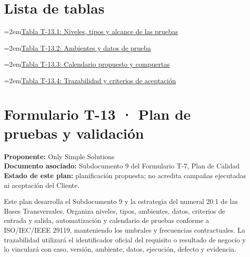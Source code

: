 \documentclass[11pt]{article}
\begin{document}
\renewcommand{\tablename}{Tabla}
\renewcommand{\thetable}{T-13.\arabic{table}}

\tableofcontents
\clearpage
\section*{Lista de tablas}

\noindent\hangindent=2em\hyperref[tab:t13-1]{Tabla T-13.1: Niveles, tipos y alcance de las pruebas}\dotfill\pageref{tab:t13-1}\par\vspace{0.4\baselineskip}
\noindent\hangindent=2em\hyperref[tab:t13-2]{Tabla T-13.2: Ambientes y datos de prueba}\dotfill\pageref{tab:t13-2}\par\vspace{0.4\baselineskip}
\noindent\hangindent=2em\hyperref[tab:t13-3]{Tabla T-13.3: Calendario propuesto y compuertas}\dotfill\pageref{tab:t13-3}\par\vspace{0.4\baselineskip}
\noindent\hangindent=2em\hyperref[tab:t13-4]{Tabla T-13.4: Trazabilidad y criterios de aceptación}\dotfill\pageref{tab:t13-4}\par\vspace{0.4\baselineskip}
\clearpage


\section{Formulario T-13 · Plan de pruebas y validación}\label{t13-formulario-t-13-plan-de-pruebas-y-validaciuxf3n}

\textbf{Proponente:} Only Simple Solutions\\
\textbf{Documento asociado:} Subdocumento 9 del Formulario T-7, Plan de Calidad\\
\textbf{Estado de este plan:} planificación propuesta; no acredita campañas ejecutadas ni aceptación del Cliente.

Este plan desarrolla el Subdocumento 9 y la estrategia del numeral 20.1 de las Bases Transversales. Organiza niveles, tipos, ambientes, datos, criterios de entrada y salida, automatización y calendario de pruebas conforme a ISO/IEC/IEEE 29119, manteniendo los umbrales y frecuencias contractuales. La trazabilidad utilizará el identificador oficial del requisito o resultado de negocio y lo vinculará con caso, versión, ambiente, datos, ejecución, defecto y evidencia.
\end{document}
